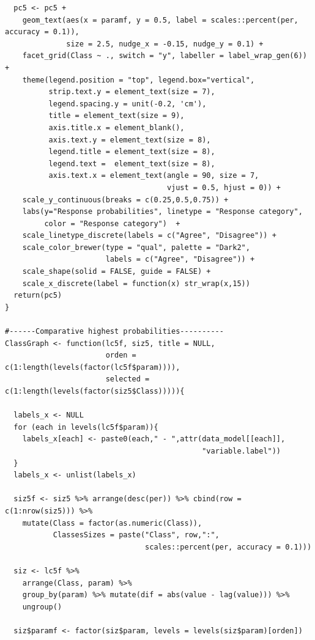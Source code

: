 \documentclass[12pt,a4paper,oneside]{reedthesis}
\begin{document}
\begin{verbatim}
  pc5 <- pc5 + 
    geom_text(aes(x = paramf, y = 0.5, label = scales::percent(per, accuracy = 0.1)), 
              size = 2.5, nudge_x = -0.15, nudge_y = 0.1) +
    facet_grid(Class ~ ., switch = "y", labeller = label_wrap_gen(6)) +
    theme(legend.position = "top", legend.box="vertical",
          strip.text.y = element_text(size = 7),
          legend.spacing.y = unit(-0.2, 'cm'),
          title = element_text(size = 9),
          axis.title.x = element_blank(), 
          axis.text.y = element_text(size = 8),
          legend.title = element_text(size = 8), 
          legend.text =  element_text(size = 8), 
          axis.text.x = element_text(angle = 90, size = 7, 
                                     vjust = 0.5, hjust = 0)) +
    scale_y_continuous(breaks = c(0.25,0.5,0.75)) +
    labs(y="Response probabilities", linetype = "Response category", 
         color = "Response category")  +
    scale_linetype_discrete(labels = c("Agree", "Disagree")) +
    scale_color_brewer(type = "qual", palette = "Dark2", 
                       labels = c("Agree", "Disagree")) +
    scale_shape(solid = FALSE, guide = FALSE) +
    scale_x_discrete(label = function(x) str_wrap(x,15))
  return(pc5)
}

#------Comparative highest probabilities----------
ClassGraph <- function(lc5f, siz5, title = NULL, 
                       orden = c(1:length(levels(factor(lc5f$param)))), 
                       selected = c(1:length(levels(factor(siz5$Class))))){
  
  labels_x <- NULL
  for (each in levels(lc5f$param)){
    labels_x[each] <- paste0(each," - ",attr(data_model[[each]], 
                                             "variable.label"))
  }
  labels_x <- unlist(labels_x)
  
  siz5f <- siz5 %>% arrange(desc(per)) %>% cbind(row = c(1:nrow(siz5))) %>% 
    mutate(Class = factor(as.numeric(Class)),
           ClassesSizes = paste("Class", row,":", 
                                scales::percent(per, accuracy = 0.1))) 
  
  siz <- lc5f %>% 
    arrange(Class, param) %>% 
    group_by(param) %>% mutate(dif = abs(value - lag(value))) %>% 
    ungroup() 
  
  siz$paramf <- factor(siz$param, levels = levels(siz$param)[orden])
  

\end{verbatim}
\end{document}
